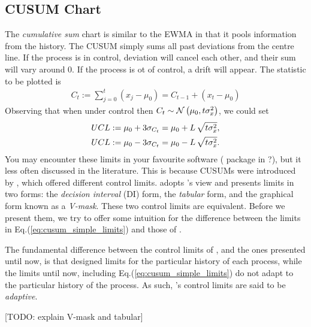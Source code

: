 \subsection{CUSUM Chart}
The \emph{cumulative sum} chart is similar to the EWMA in that it pools information from the history. 
The CUSUM simply sums all past deviations from the centre line.
If the process is in control, deviation will cancel each other, and their sum will vary around $0$. 
If the process is ot of control, a drift will appear. 
The statistic to be plotted is 
\begin{align}
	C_t:= \sum_{j=0}^{t}(x_j-\mu_0)=C_{t-1}+ (x_t-\mu_0)
\end{align} 
Observing that when under control then $C_t \sim \mathcal{N}\left(\mu_0, t \sigma_x^2\right)$, we could set 
\begin{align}
\label{eq:cusum_simple_limits}
\begin{split}
	UCL &:= \mu_0 + 3 \sigma_{C_t}= \mu_0 + L \, \sqrt{t \sigma_x^2},  \\
	UCL &:= \mu_0 - 3 \sigma_{C_t}= \mu_0 - L \, \sqrt{t \sigma_x^2}.
\end{split}
\end{align}
You may encounter these limits in your favourite software ( package in \R?), but it less often discussed in the literature. 
This is because CUSUMs were introduced by \cite{page_continuous_1954}, which offered different control limits. 
\cite{montgomery_introduction_2007} adopts \citeauthor{page_continuous_1954}'s view and presents limits in two forms: the \emph{decision interval} (DI) form, \aka the \emph{tabular} form, and the graphical form known as a \emph{V-mask}.
These two control limits are equivalent. Before we present them, we try to offer some intuition for the difference between the limits in Eq.(\ref{eq:cusum_simple_limits}) and those of \cite{page_continuous_1954}.

The fundamental difference between the control limits of \cite{page_continuous_1954}, and the ones presented until now, is that \citeauthor{page_continuous_1954} designed limits for the particular history of each process, while the limits until now, including Eq.(\ref{eq:cusum_simple_limits}) do not adapt to the particular history of the process.
As such, \citeauthor{page_continuous_1954}'s control limits are said to be \emph{adaptive}.

[TODO: explain V-mask and tabular]





